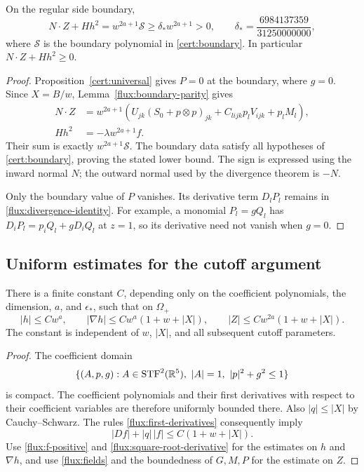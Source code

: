 \begin{proposition}\label{flux:boundary-comparison}
On the regular side boundary,
\begin{equation}\label{flux:signed-boundary-identity}
 N\cdot Z+Hh^2=w^{2a+1}\mathcal S
   \geq\delta_*w^{2a+1}>0,
 \qquad
 \delta_* =\frac{6984137359}{31250000000},
\end{equation}
where $\mathcal S$ is the boundary polynomial in
\eqref{cert:boundary}.  In particular $N\cdot Z+Hh^2\geq0$.
\end{proposition}

\begin{proof}
Proposition~\ref{cert:universal} gives $P=0$ at the boundary, where $g=0$.
Since $X=B/w$, Lemma~\ref{flux:boundary-parity} gives
\begin{align*}
 N\cdot Z
 &=w^{2a+1}\left(
       U_{jk}(S_0+p\otimes p)_{jk}
       +C_{lijk}p_lV_{ijk}+p_lM_l\right),\\
 Hh^2&=-\lambda w^{2a+1}f.
\end{align*}
Their sum is exactly $w^{2a+1}\mathcal S$.  The boundary data satisfy
all hypotheses of \eqref{cert:boundary}, proving the stated lower
bound.  The sign is expressed using the inward normal $N$; the outward
normal used by the divergence theorem is $-N$.

Only the boundary value of $P$ vanishes.  Its derivative term
$D_lP_l$ remains in \eqref{flux:divergence-identity}.  For example, a
monomial $P_l=gQ_l$ has $D_iP_l=p_iQ_l+gD_iQ_l$ at $z=1$, so its
derivative need not vanish when $g=0$.
\end{proof}

\subsection{Uniform estimates for the cutoff argument}

\begin{lemma}\label{flux:field-bounds}
There is a finite constant $C$, depending only on the coefficient
polynomials, the dimension, $a$, and $\epsilon_*$, such that on
$\Omega_+$
\begin{equation}\label{flux:uniform-field-bounds}
 |h|\leq Cw^a,\qquad
 |\nabla h|\leq Cw^a(1+w+|X|),\qquad
 |Z|\leq Cw^{2a}(1+w+|X|).
\end{equation}
The constant is independent of $w$, $|X|$, and all subsequent cutoff
parameters.
\end{lemma}

\begin{proof}
The coefficient domain
\[
 \{(A,p,g):A\in\STF^2(\R^5),\ |A|=1,\ |p|^2+g^2\leq1\}
\]
is compact.  The coefficient polynomials and their first derivatives
with respect to their coefficient variables are therefore uniformly
bounded there.  Also $|q|\leq|X|$ by Cauchy--Schwarz.  The rules
\eqref{flux:first-derivatives} consequently imply
\[
 |D f|+|q|\,|f|\leq C(1+w+|X|).
\]
Use \eqref{flux:f-positive} and
\eqref{flux:square-root-derivative} for the estimates on $h$ and
$\nabla h$, and use \eqref{flux:fields} and the boundedness of $G,M,P$
for the estimate on $Z$.
\end{proof}
